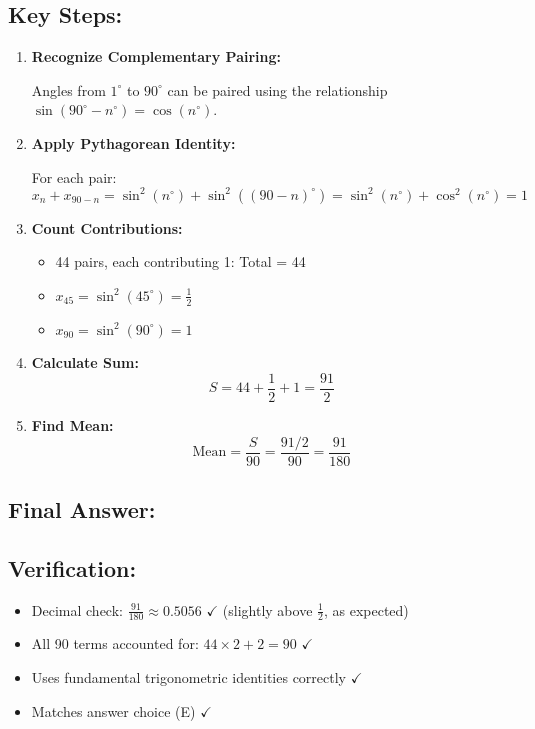 \documentclass[12pt]{article}
\begin{document}
\subsection*{Key Steps:}

\begin{enumerate}
    \item \textbf{Recognize Complementary Pairing:} 
    
    Angles from $1^{\circ}$ to $90^{\circ}$ can be paired using the relationship $\sin(90^{\circ} - n^{\circ}) = \cos(n^{\circ})$.
    
    \item \textbf{Apply Pythagorean Identity:}
    
    For each pair:
    \[
    x_n + x_{90-n} = \sin^2(n^{\circ}) + \sin^2((90-n)^{\circ}) = \sin^2(n^{\circ}) + \cos^2(n^{\circ}) = 1
    \]
    
    \item \textbf{Count Contributions:}
    
    \begin{itemize}
        \item 44 pairs, each contributing 1: Total = 44
        \item $x_{45} = \sin^2(45^{\circ}) = \frac{1}{2}$
        \item $x_{90} = \sin^2(90^{\circ}) = 1$
    \end{itemize}
    
    \item \textbf{Calculate Sum:}
    \[
    S = 44 + \frac{1}{2} + 1 = \frac{91}{2}
    \]
    
    \item \textbf{Find Mean:}
    \[
    \text{Mean} = \frac{S}{90} = \frac{91/2}{90} = \frac{91}{180}
    \]
\end{enumerate}

\subsection*{Final Answer:}

\begin{center}
\end{center}

\vspace{1em}

\subsection*{Verification:}
\begin{itemize}
    \item Decimal check: $\frac{91}{180} \approx 0.5056$ $\checkmark$ (slightly above $\frac{1}{2}$, as expected)
    \item All 90 terms accounted for: $44 \times 2 + 2 = 90$ $\checkmark$
    \item Uses fundamental trigonometric identities correctly $\checkmark$
    \item Matches answer choice (E) $\checkmark$
\end{itemize}
\end{document}
